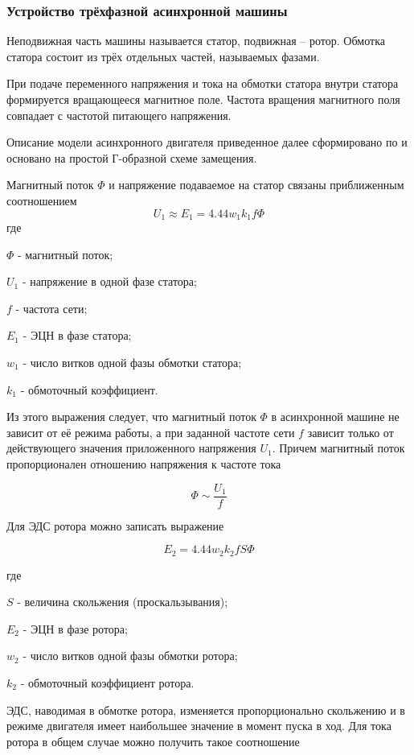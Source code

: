 \subsubsection{ Устройство трёхфазной асинхронной машины}
Неподвижная часть машины называется статор, подвижная – ротор. Обмотка статора состоит из трёх отдельных частей, называемых фазами.

При подаче переменного напряжения и тока на обмотки статора внутри статора формируется вращающееся магнитное поле. Частота вращения магнитного поля совпадает с частотой питающего напряжения. 

Описание модели асинхронного двигателя приведенное далее сформировано по \cite{Gridin, Gridin_2018} и основано на простой Г-образной схеме замещения. 

Магнитный поток $\Phi $ и напряжение подаваемое на статор связаны приближенным соотношением 
$$ U_1 \approx E_1 = 4.44 w_1 k_1 f \Phi $$
где 

 $\Phi$ -  магнитный поток;
 
 $U_1$ -	напряжение в одной фазе статора;
 
 $f$   - частота сети;
 
 $E_1$	- ЭЦН в фазе статора;
 
 $w_1$ - число витков одной фазы обмотки статора;
 
 $k_1$  - обмоточный коэффициент.
   
Из этого выражения следует, что магнитный поток $\Phi $ в асинхронной машине не зависит от её режима работы, а при заданной частоте сети $f$ зависит только от действующего значения приложенного напряжения $U_1$. Причем магнитный поток пропорционален отношению напряжения к частоте тока 

$$ \Phi  \sim  \frac{U_1}{f}   $$

Для ЭДС ротора можно записать выражение 


$$  E_2 = 4.44 w_2 k_2 f S \Phi $$

где 


$S$ - величина скольжения (проскальзывания);

$E_2$	- ЭЦН в фазе ротора;

$w_2$ - число витков одной фазы обмотки ротора;

$k_2$ - обмоточный коэффициент ротора.

ЭДС, наводимая в обмотке ротора, изменяется пропорционально скольжению и в режиме двигателя имеет наибольшее значение в момент пуска в ход.
Для тока ротора в общем случае можно получить такое соотношение

